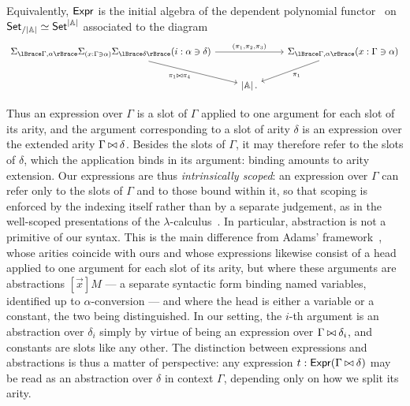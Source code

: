 \begin{remark}
    Equivalently, $\mathsf{Expr}$ is the initial algebra of the dependent polynomial functor~\cite{GambinoHyland2004} on $\mathsf{Set}_{/\left|\mathbb{A}\right|} \simeq \mathsf{Set}^{\left|\mathbb{A}\right|}$ associated to the diagram
    \[\begin{tikzcd}
        {\Sigma_{\lBrace \Gamma, \alpha\rBrace} \Sigma_{(x : \Gamma \ni \alpha)} \Sigma_{\lBrace \delta \rBrace}(i : \alpha \ni \delta)} && {\Sigma_{\lBrace \Gamma, \alpha\rBrace}(x : \Gamma \ni \alpha)} \\
        & {\left|\bA\right|.}
        \arrow["{(\pi_1,\pi_2,\pi_3)}", from=1-1, to=1-3]
        \arrow["{\pi_1\concat\pi_4}"', from=1-1, to=2-2]
        \arrow["{\pi_1}", from=1-3, to=2-2]
    \end{tikzcd}\]
\end{remark}

Thus an expression over $\Gamma$ is a slot of $\Gamma$ applied to one argument for each slot of its arity, and the argument corresponding to a slot of arity $\delta$ is an expression over the extended arity $\Gamma \mathbin{\bowtie} \delta$. Besides the slots of $\Gamma$, it may therefore refer to the slots of $\delta$, which the application binds in its argument: binding amounts to arity extension. Our expressions are thus \emph{intrinsically scoped}: an expression over $\Gamma$ can refer only to the slots of $\Gamma$ and to those bound within it, so that scoping is enforced by the indexing itself rather than by a separate judgement, as in the well-scoped presentations of the $\lambda$-calculus~\cite{AltenkirchReus1999,AltenkirchChapmanUustalu2015}.
 In particular, abstraction is not a primitive of our syntax. This is the main difference from Adams' framework~\cite{Adams2008}, whose arities coincide with ours and whose expressions likewise consist of a head applied to one argument for each slot of its arity, but where these arguments are abstractions $[\vec x]M$ --- a separate syntactic form binding named variables, identified up to $\alpha$-conversion --- and where the head is either a variable or a constant, the two being distinguished. In our setting, the $i$-th argument is an abstraction over $\delta_i$ simply by virtue of being an expression over $\Gamma \mathbin{\bowtie} \delta_i$, and constants are slots like any other. The distinction between expressions and abstractions is thus a matter of perspective: any expression $t : \mathsf{Expr}(\Gamma \mathbin{\bowtie} \delta)$ may be read as an abstraction over $\delta$ in context $\Gamma$, depending only on how we split its arity.

